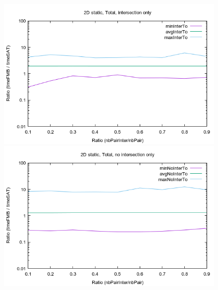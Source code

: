 \documentclass[12pt, a4paper]{article}
\begin{document}
\begin{center}
\begin{figure}[H]
\centering\includegraphics[width=12cm]{../Results/qualification2Dinter.png}\\
\centering\includegraphics[width=12cm]{../Results/qualification2Dnointer.png}\\
\end{figure}
\end{center}
\end{document}
